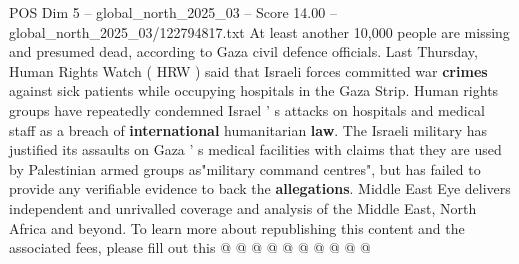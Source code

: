 \begin{textsample}{POS Dim 5 – global\_north\_2025\_03 – Score 14.00 – global\_north\_2025\_03/122794817.txt}
At least another 10,000 people are missing and presumed dead, according to Gaza civil defence officials.
Last Thursday, Human Rights Watch ( HRW ) said that Israeli forces committed war \textbf{crimes} against sick patients while occupying hospitals in the Gaza Strip.
Human rights groups have repeatedly condemned Israel ' s attacks on hospitals and medical staff as a breach of \textbf{international} humanitarian \textbf{law}.
The Israeli military has justified its assaults on Gaza ' s medical facilities with claims that they are used by Palestinian armed groups as"military command centres", but has failed to provide any verifiable evidence to back the \textbf{allegations}.
Middle East Eye delivers independent and unrivalled coverage and analysis of the Middle East, North Africa and beyond.
To learn more about republishing this content and the associated fees, please fill out this @ @ @ @ @ @ @ @ @ @

\end{textsample}
